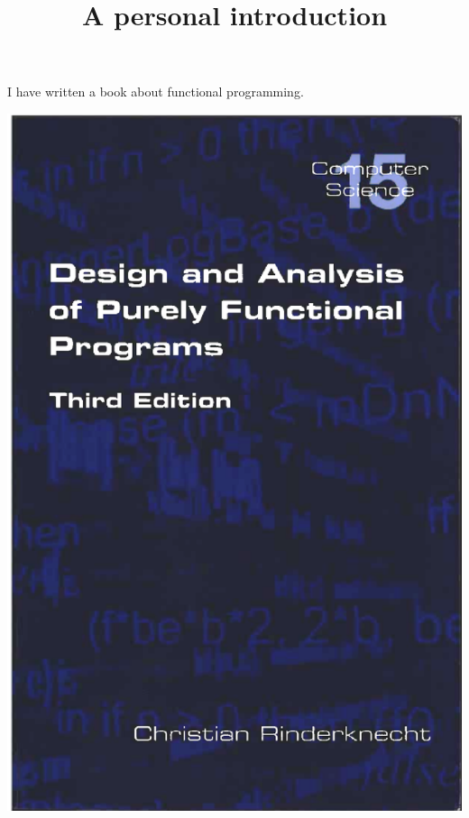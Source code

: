 \documentclass[wide]{slides}
\begin{document}
\begin{slide}
  \title{A personal introduction}

  \begin{minipage}{0.5\linewidth}
    I have written a book about functional programming.
  \end{minipage}%
  \begin{minipage}{0.5\linewidth}
    \includegraphics[scale=0.35]{my_book.eps}
  \end{minipage}%

\end{slide}
\end{document}
